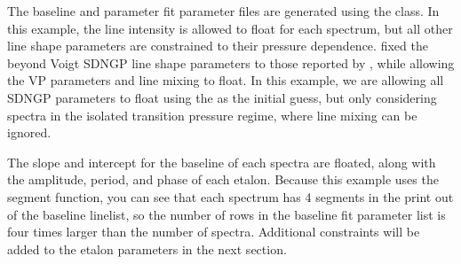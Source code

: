 \documentclass[letterpaper,10pt,english]{sphinxmanual}
\begin{document}
\sphinxAtStartPar
The baseline and parameter fit parameter files are generated using the {\hyperref[\detokenize{MATS:MATS.generate_fitparam_file.Generate_FitParam_File}]{}} class.  In this example, the line intensity is allowed to float for each spectrum, but all other line shape parameters are constrained to their pressure dependence.   fixed the beyond Voigt SDNGP line shape parameters to those reported by  , while allowing the VP parameters and line mixing to float.  In this example, we are allowing all SDNGP parameters to float using the  as the initial guess, but only considering spectra in the isolated transition pressure regime, where line mixing can be ignored.

\sphinxAtStartPar
The slope and intercept for the baseline of each spectra are floated, along with the amplitude, period, and phase of each etalon.  Because this example uses the segment function, you can see that each spectrum has 4 segments in the print out of the baseline linelist, so the number of rows in the baseline fit parameter list is four times larger than the number of spectra.  Additional constraints will be added to the etalon parameters in the next section.
\end{document}
